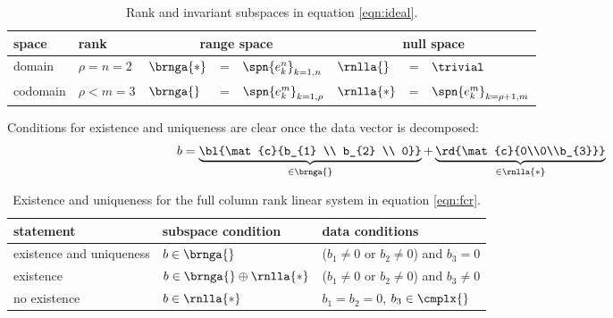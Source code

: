 \begin{table}[htbp]  %
    \caption{Rank and invariant subspaces in equation \eqref{eqn:ideal}.}
    \begin{center}
        \begin{tabular}{lllcllcl}
            space & rank & \multicolumn{3}{c}{range space} & \multicolumn{3}{c}{null space} \\\hline
            domain   & $\rho = n = 2$ & $\brnga{*}$ & = & $\spn{e_{k}^{n}}_{k=1,n}$    & $\rnlla{}$  & = & $\trivial$ \\
            codomain & $\rho < m = 3$ & $\brnga{}$  & = & $\spn{e_{k}^{m}}_{k=1,\rho}$ & $\rnlla{*}$ & = & $\spn{e_{k}^{m}}_{k=\rho+1,m}$ \\
        \end{tabular}
    \end{center}
\end{table}%

Conditions for existence and uniqueness are clear once the data vector is decomposed:
  \begin{equation}
      b = \underbrace{\bl{\mat{c}{b_{1} \\ b_{2} \\ 0}}}_{\in\brnga{}} + \underbrace{\rd{\mat{c}{0\\0\\b_{3}}}}_{\in\rnlla{*}}
  \end{equation}

    \begin{table}[t]
    	\caption{Existence and uniqueness for the full column rank linear system in equation \eqref{eqn:fcr}.}
    	\begin{center}
    		\begin{tabular}{lll}
    		  statement & subspace condition & data conditions\\\hline
    		  existence and uniqueness & $b\in\brnga{}$ & ($b_{1}\ne0$ or $b_{2}\ne0$) and $b_{3} = 0 $ \\[3pt]
    		  existence  & $b\in\brnga{} \oplus \rnlla{*} $ &  ($b_{1}\ne0$ or $b_{2}\ne0$) and $b_{3} \ne 0 $ \\[3pt]
    		  no existence & $b\in\rnlla{*}$ & $b_{1} = b_{2} = 0$, $b_{3}\in\cmplx{}$ \\
    		\end{tabular}
    	\end{center}
    	\label{tab:ftola spaces}
    \end{table}%



